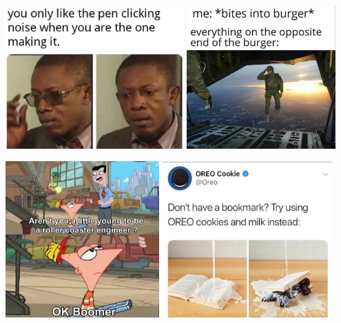 \documentclass{article}
\begin{document}
\begin{center}
\includegraphics[height=5.5cm]{m1.jpeg}
\includegraphics[height=5.5cm]{m2.jpeg}

\includegraphics[height=6cm]{m3.jpeg}
\includegraphics[height=6cm]{m4.jpeg}
\end{center}
\end{document}
